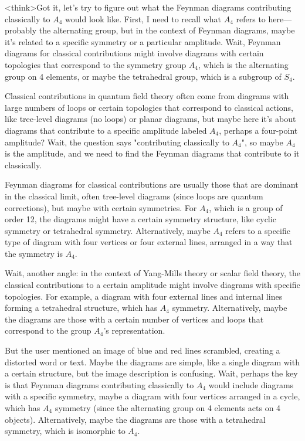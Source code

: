 <think>Got it, let's try to figure out what the Feynman diagrams contributing classically to \( A_4 \) would look like. First, I need to recall what \( A_4 \) refers to here—probably the alternating group, but in the context of Feynman diagrams, maybe it's related to a specific symmetry or a particular amplitude. Wait, Feynman diagrams for classical contributions might involve diagrams with certain topologies that correspond to the symmetry group \( A_4 \), which is the alternating group on 4 elements, or maybe the tetrahedral group, which is a subgroup of \( S_4 \).

Classical contributions in quantum field theory often come from diagrams with large numbers of loops or certain topologies that correspond to classical actions, like tree-level diagrams (no loops) or planar diagrams, but maybe here it's about diagrams that contribute to a specific amplitude labeled \( A_4 \), perhaps a four-point amplitude? Wait, the question says "contributing classically to \( A_4 \)", so maybe \( A_4 \) is the amplitude, and we need to find the Feynman diagrams that contribute to it classically.

Feynman diagrams for classical contributions are usually those that are dominant in the classical limit, often tree-level diagrams (since loops are quantum corrections), but maybe with certain symmetries. For \( A_4 \), which is a group of order 12, the diagrams might have a certain symmetry structure, like cyclic symmetry or tetrahedral symmetry. Alternatively, maybe \( A_4 \) refers to a specific type of diagram with four vertices or four external lines, arranged in a way that the symmetry is \( A_4 \).

Wait, another angle: in the context of Yang-Mills theory or scalar field theory, the classical contributions to a certain amplitude might involve diagrams with specific topologies. For example, a diagram with four external lines and internal lines forming a tetrahedral structure, which has \( A_4 \) symmetry. Alternatively, maybe the diagrams are those with a certain number of vertices and loops that correspond to the group \( A_4 \)'s representation.

But the user mentioned an image of blue and red lines scrambled, creating a distorted word or text. Maybe the diagrams are simple, like a single diagram with a certain structure, but the image description is confusing. Wait, perhaps the key is that Feynman diagrams contributing classically to \( A_4 \) would include diagrams with a specific symmetry, maybe a diagram with four vertices arranged in a cycle, which has \( A_4 \) symmetry (since the alternating group on 4 elements acts on 4 objects). Alternatively, maybe the diagrams are those with a tetrahedral symmetry, which is isomorphic to \( A_4 \).

